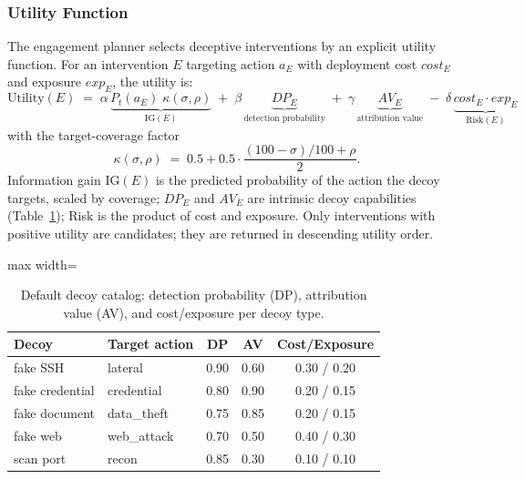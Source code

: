 \documentclass[preprints,article,accept,oneauthor]{Definitions/mdpi}
\begin{document}
\subsubsection{Utility Function}
\label{sec:utility-formal}

The engagement planner selects deceptive interventions by an explicit
utility function. For an intervention $E$ targeting action $a_E$ with
deployment cost $\mathit{cost}_E$ and exposure $\mathit{exp}_E$, the utility
is:
\begin{equation}
\label{eq:utility}
\mathrm{Utility}(E) \;=\;
\alpha\,\underbrace{P_t(a_E)\; \kappa(\sigma,\rho)}_{\mathrm{IG}(E)}
\;+\; \beta\,\underbrace{\mathit{DP}_E}_{\text{detection probability}}
\;+\; \gamma\,\underbrace{\mathit{AV}_E}_{\text{attribution value}}
\;-\; \delta\,\underbrace{\mathit{cost}_E \cdot \mathit{exp}_E}_{\mathrm{Risk}(E)}
\end{equation}
with the target-coverage factor
\begin{equation}
\label{eq:coverage}
\kappa(\sigma,\rho) \;=\; 0.5 + 0.5 \cdot \frac{(100-\sigma)/100 + \rho}{2}.
\end{equation}
Information gain $\mathrm{IG}(E)$ is the predicted probability of the action
the decoy targets, scaled by coverage; $\mathit{DP}_E$ and $\mathit{AV}_E$
are intrinsic decoy capabilities (Table~\ref{tab:decoy}); Risk is the
product of cost and exposure. Only interventions with positive utility are
candidates; they are returned in descending utility order.

\begin{table}[ht]
\centering
\begin{adjustbox}{max width=\linewidth}\begin{tabular}{@{}llccc@{}}
\toprule
\textbf{Decoy} & \textbf{Target action} & \textbf{DP} & \textbf{AV} & \textbf{Cost/Exposure} \\
\midrule
fake SSH & lateral & 0.90 & 0.60 & 0.30 / 0.20 \\
fake credential & credential & 0.80 & 0.90 & 0.20 / 0.15 \\
fake document & data\_theft & 0.75 & 0.85 & 0.20 / 0.15 \\
fake web & web\_attack & 0.70 & 0.50 & 0.40 / 0.30 \\
scan port & recon & 0.85 & 0.30 & 0.10 / 0.10 \\
\bottomrule
\end{tabular}\end{adjustbox}
\caption{Default decoy catalog: detection probability (DP), attribution
value (AV), and cost/exposure per decoy type.}
\label{tab:decoy}
\end{table}
\end{document}
